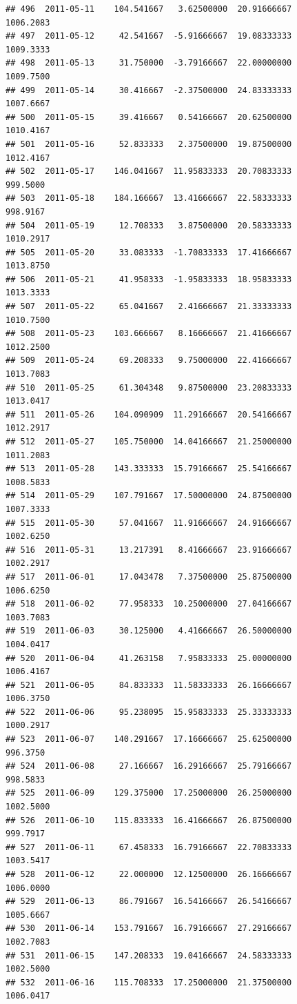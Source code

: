 \documentclass[
]{article}
\begin{document}
\begin{verbatim}
## 496  2011-05-11    104.541667   3.62500000  20.91666667    1006.2083
## 497  2011-05-12     42.541667  -5.91666667  19.08333333    1009.3333
## 498  2011-05-13     31.750000  -3.79166667  22.00000000    1009.7500
## 499  2011-05-14     30.416667  -2.37500000  24.83333333    1007.6667
## 500  2011-05-15     39.416667   0.54166667  20.62500000    1010.4167
## 501  2011-05-16     52.833333   2.37500000  19.87500000    1012.4167
## 502  2011-05-17    146.041667  11.95833333  20.70833333     999.5000
## 503  2011-05-18    184.166667  13.41666667  22.58333333     998.9167
## 504  2011-05-19     12.708333   3.87500000  20.58333333    1010.2917
## 505  2011-05-20     33.083333  -1.70833333  17.41666667    1013.8750
## 506  2011-05-21     41.958333  -1.95833333  18.95833333    1013.3333
## 507  2011-05-22     65.041667   2.41666667  21.33333333    1010.7500
## 508  2011-05-23    103.666667   8.16666667  21.41666667    1012.2500
## 509  2011-05-24     69.208333   9.75000000  22.41666667    1013.7083
## 510  2011-05-25     61.304348   9.87500000  23.20833333    1013.0417
## 511  2011-05-26    104.090909  11.29166667  20.54166667    1012.2917
## 512  2011-05-27    105.750000  14.04166667  21.25000000    1011.2083
## 513  2011-05-28    143.333333  15.79166667  25.54166667    1008.5833
## 514  2011-05-29    107.791667  17.50000000  24.87500000    1007.3333
## 515  2011-05-30     57.041667  11.91666667  24.91666667    1002.6250
## 516  2011-05-31     13.217391   8.41666667  23.91666667    1002.2917
## 517  2011-06-01     17.043478   7.37500000  25.87500000    1006.6250
## 518  2011-06-02     77.958333  10.25000000  27.04166667    1003.7083
## 519  2011-06-03     30.125000   4.41666667  26.50000000    1004.0417
## 520  2011-06-04     41.263158   7.95833333  25.00000000    1006.4167
## 521  2011-06-05     84.833333  11.58333333  26.16666667    1006.3750
## 522  2011-06-06     95.238095  15.95833333  25.33333333    1000.2917
## 523  2011-06-07    140.291667  17.16666667  25.62500000     996.3750
## 524  2011-06-08     27.166667  16.29166667  25.79166667     998.5833
## 525  2011-06-09    129.375000  17.25000000  26.25000000    1002.5000
## 526  2011-06-10    115.833333  16.41666667  26.87500000     999.7917
## 527  2011-06-11     67.458333  16.79166667  22.70833333    1003.5417
## 528  2011-06-12     22.000000  12.12500000  26.16666667    1006.0000
## 529  2011-06-13     86.791667  16.54166667  26.54166667    1005.6667
## 530  2011-06-14    153.791667  16.79166667  27.29166667    1002.7083
## 531  2011-06-15    147.208333  19.04166667  24.58333333    1002.5000
## 532  2011-06-16    115.708333  17.25000000  21.37500000    1006.0417

\end{verbatim}
\end{document}

